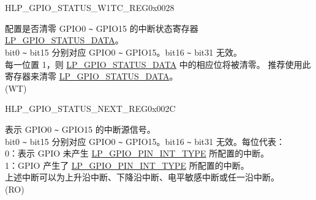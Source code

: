 \begin{register}{H}{LP\_GPIO\_STATUS\_W1TC\_REG}{0x0028}\label{regdesc:LPGPIOSTATUSW1TCREG}
%
%
\regnewline%
\begin{regdesc}\begin{reglist}
\label{fielddesc:LPGPIOSTATUSDATAW1TC}\item [LP\_GPIO\_STATUS\_DATA\_W1TC] 配置是否清零 GPIO0 \verb+~+ GPIO15 的中断状态寄存器  \hyperref[fielddesc:LPGPIOSTATUSDATA]{LP\_GPIO\_STATUS\_DATA}。\\
bit0 \verb+~+ bit15 分别对应 GPIO0 \verb+~+ GPIO15。bit16 \verb+~+ bit31 无效。\\
每一位置 1，则  \hyperref[fielddesc:LPGPIOSTATUSDATA]{LP\_GPIO\_STATUS\_DATA} 中的相应位将被清零。 推荐使用此寄存器来清零  \hyperref[fielddesc:LPGPIOSTATUSDATA]{LP\_GPIO\_STATUS\_DATA}。\\
(WT)
\end{reglist}\end{regdesc}
\end{register}


\begin{register}{H}{LP\_GPIO\_STATUS\_NEXT\_REG}{0x002C}\label{regdesc:LPGPIOSTATUSNEXTREG}
%
%
\regnewline%
\begin{regdesc}\begin{reglist}
\label{fielddesc:LPGPIOSTATUSINTERRUPTNEXT}\item [LP\_GPIO\_STATUS\_INTERRUPT\_NEXT] 表示 GPIO0 \verb+~+ GPIO15 的中断源信号。\\
bit0 \verb+~+ bit15 分别对应 GPIO0 \verb+~+ GPIO15。bit16 \verb+~+ bit31 无效。每位代表：\\
 0：表示 GPIO 未产生  \hyperref[fielddesc:LPGPIOPINNINTTYPE]{LP\_GPIO\_PIN\_INT\_TYPE} 所配置的中断。\\
1：GPIO 产生了  \hyperref[fielddesc:LPGPIOPINNINTTYPE]{LP\_GPIO\_PIN\_INT\_TYPE} 所配置的中断。\\
上述中断可以为上升沿中断、下降沿中断、电平敏感中断或任一沿中断。\\  (RO)
\end{reglist}\end{regdesc}
\end{register}


